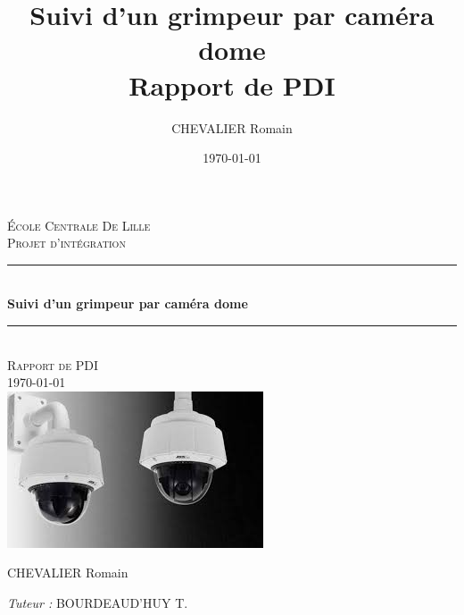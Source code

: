 \documentclass[a4paper, 11pt, french]{article}
\title{%
        \Huge Suivi d'un grimpeur par caméra dome \\
        \LARGE Rapport de PDI}
\author{\LARGE CHEVALIER Romain}
\date{\today}
\newcommand{\HRule}{\rule{\linewidth}{0.5mm}}
\begin{document}
\begin{titlepage}

    \begin{titlepage}
        \begin{center}
      
      
          \textsc{\LARGE École Centrale De Lille}\\[2cm]
      
          \textsc{\huge Projet d'intégration}\\[2cm]
      
          \HRule \\[0.4cm]
          { \Huge \bfseries Suivi d'un grimpeur par caméra dome\\[0.4cm] }
      
          \HRule \\[2cm]

          \textsc{\Large Rapport de PDI \\} {\large\today}\\[1.5cm]
          
          \vfill
          \includegraphics[width=.8\textwidth]{Figures/cameraQ6304.jpg}
          \vfill

          \begin{minipage}{0.4\textwidth}
            \begin{flushleft} \large
              CHEVALIER Romain\\
            \end{flushleft}
          \end{minipage}
          \begin{minipage}{0.4\textwidth}
            \begin{flushright} \large
              \emph{Tuteur :}  BOURDEAUD'HUY T. \\
            \end{flushright}
          \end{minipage}
      

\end{center}
\end{titlepage}
\end{titlepage}
\end{document}
